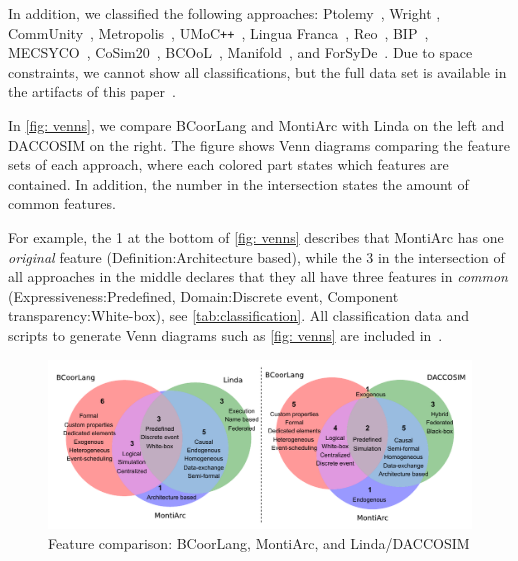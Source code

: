 \documentclass[runningheads]{llncs}
\begin{document}
In addition, we classified the following approaches: Ptolemy~\cite{ekerTamingHeterogeneityPtolemy2003,ptolemaeusSystemDesignModeling2014}, Wright \cite{allenFormalBasisArchitectural1997,allenFormalApproachSoftware1997}, CommUnity~\cite{fiadeiroSemanticsArchitecturalConnectors1997,oliveiraCommUnityWorkbench2007}, Metropolis~\cite{balarinMetropolisIntegratedElectronic2003}, UMoC\texttt{++}~\cite{mathaikuttyUMoCBasedMultiMoC2006}, Lingua Franca~\cite{lohstrohReactorsDeterministicModel2020,lohstrohLinguaFrancaDeterministic2021}, Reo~\cite{arbabReoChannelbasedCoordination2004}, BIP~\cite{bliudzeAlgebraConnectorsStructuring2008,basuRigorousComponentBasedSystem2011},
MECSYCO~\cite{camusCosimulationCyberphysicalSystems2018,camusHybridCosimulationFMUs2016},
CoSim20~\cite{liboniComplexSystemsCosimulation2021},
BCOoL~\cite{varalarsenBehavioralCoordinationOperator2015,varalarsenBCOolBehavioralCoordination2016},
Manifold~\cite{arbabOverviewManifoldIts1993,papadopoulosModellingActivitiesInformation1998}, and ForSyDe~\cite{sanderSystemModelingTransformational2004,sanderForSyDeSystemDesign2016}.
Due to space constraints, we cannot show all classifications, but the full data set is available in the artifacts of this paper~\cite{timkrauterArtifactsCoordination2024}.

In \autoref{fig: venns}, we compare BCoorLang and MontiArc with Linda on the left and DACCOSIM on the right.
The figure shows Venn diagrams comparing the feature sets of each approach, where each colored part states which features are contained.
In addition, the number in the intersection states the amount of common features.

For example, the \textsf{1} at the bottom of \autoref{fig: venns} describes that MontiArc has one \textit{original} feature (\textsf{Definition:Architecture based}), while the \textsf{3} in the intersection of all approaches in the middle declares that they all have three features in \textit{common} (\textsf{Expressiveness:Predefined, Domain:Discrete event, Component transparency:White-box}), see \autoref{tab:classification}.
All classification data and scripts to generate Venn diagrams such as \autoref{fig: venns} are included in~\cite{timkrauterArtifactsCoordination2024}.

\begin{figure}[ht]
	\centering
	\includegraphics[width=1\textwidth]{images/venns}
	\caption{Feature comparison: BCoorLang, MontiArc, and Linda/DACCOSIM}
	\label{fig: venns}
\end{figure}
\end{document}
